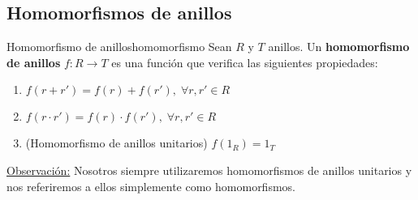 \documentclass[10pt, a4paper]{article}
\newcommand{\obs}{\underline{Observación:} }
\newenvironment{enumerater}{\begin{enumerate}[label=\roman*)]}
{\end{enumerate}}
\begin{document}
\subsection{Homomorfismos de anillos}

\vspace{3mm}

\begin{definition}{Homomorfismo de anillos}{homomorfismo}
Sean $R$ y $T$ anillos. Un \textbf{homomorfismo de anillos} $f : R \longrightarrow T$ es una función que verifica las siguientes propiedades:

\begin{enumerater}
	\item $f(r + r') = f(r) + f(r'), \; \forall r, r' \in R$
	\item $f(r \cdot r') = f(r) \cdot f(r'), \; \forall r, r' \in R$
	\item (Homomorfismo de anillos unitarios) $f(1_R) = 1_T$
\end{enumerater}

\obs Nosotros siempre utilizaremos homomorfismos de anillos unitarios y nos referiremos a ellos simplemente como homomorfismos.

\end{definition}
\end{document}
